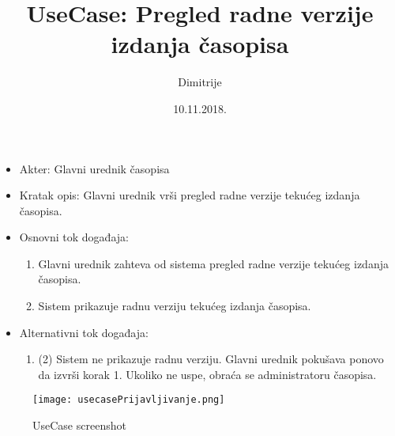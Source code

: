 \documentclass[a4paper]{article}
\title{UseCase: Pregled radne verzije izdanja časopisa}
\date{10.11.2018.}
\author{Dimitrije}
\begin{document}
\maketitle

\begin{itemize}
    \item Akter: Glavni urednik časopisa
    \item Kratak opis: Glavni urednik vrši pregled radne verzije tekućeg izdanja časopisa.
    \item Osnovni tok događaja:
        \begin{enumerate}
            \item Glavni urednik zahteva od sistema pregled radne verzije tekućeg izdanja časopisa.
            \item Sistem prikazuje radnu verziju tekućeg izdanja časopisa.
        \end{enumerate}
    \item Alternativni tok događaja:
        \begin{enumerate}
            \item  (2) Sistem ne prikazuje radnu verziju. Glavni urednik pokušava ponovo da izvrši korak 1. Ukoliko ne uspe, obraća se administratoru časopisa.
        \end{enumerate}
\end{itemize}

\begin{figure}
    \centering
    \texttt{[image: usecasePrijavljivanje.png]}
    \caption{UseCase screenshot}
    \label{fig:my_label}
\end{figure}
\end{document}
